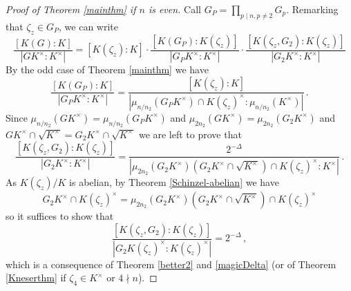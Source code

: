 \documentclass[10pt,a4paper]{amsart}
\begin{document}
\begin{proof}[Proof of Theorem \ref{mainthm} if $n$ is even]
Call $G_{P}=\prod_{p\mid n, p\neq 2} G_p$. Remarking that $\zeta_z\in G_P$, we can write     $$\frac{[K(G):K]}{|GK^\times:K^\times|}=[K(\zeta_z):K]\cdot 
\frac{[K(G_{P}):K(\zeta_z)]}{|G_{P}K^\times:K^\times|} \cdot
    \frac{[K(\zeta_z,G_2):K(\zeta_z)]}{|G_2 K^\times:K^\times|}
    $$
By the odd case of Theorem \ref{mainthm} we have
$$\frac{[K(G_{P}):K]}{|G_{P}K^\times:K^\times|}=\frac{[K(\zeta_z):K]}{|\mu_{n/n_2}(G_P K^\times)\cap K(\zeta_{z})^\times: \mu_{n/n_2}( K^\times)|}\,.$$
Since $\mu_{n/n_2}(G K^\times)=\mu_{n/n_2}(G_P K^\times)$ and $\mu_{2n_2}(G K^\times)=\mu_{2n_2}(G_2 K^\times)$ and $GK^\times \cap \sqrt{K^\times}=G_2K^\times \cap \sqrt{K^\times}$ we are left to prove that
$$\frac{[K(\zeta_z,G_2):K(\zeta_z)]}{|G_2 K^\times:K^\times|}=\frac{2^{-\Delta}}{|\mu_{2n_2}(G_2 K^\times)(G_2K^\times\cap\sqrt{K^\times})\cap K(\zeta_z)^\times: K^\times|}\,.$$
As $K(\zeta_z)/K$ is abelian, by Theorem \ref{Schinzel-abelian}
we have   
$$G_2 K^\times\cap K(\zeta_z)^\times=\mu_{2n_2}(G_2 K^\times)(G_2K^\times\cap\sqrt{K^\times})\cap K(\zeta_z)^\times$$
so it suffices to show that 
$$\frac{[K(\zeta_z,G_2):K(\zeta_z)]}{|G_2 K(\zeta_z)^\times:K(\zeta_z)^\times|}=2^{-\Delta}\,,$$
which is a consequence of Theorem \ref{better2} and \eqref{magicDelta} (or of Theorem \ref{Kneserthm} if $\zeta_4\in K^\times$ or $4\nmid n$).
\end{proof}
\end{document}
